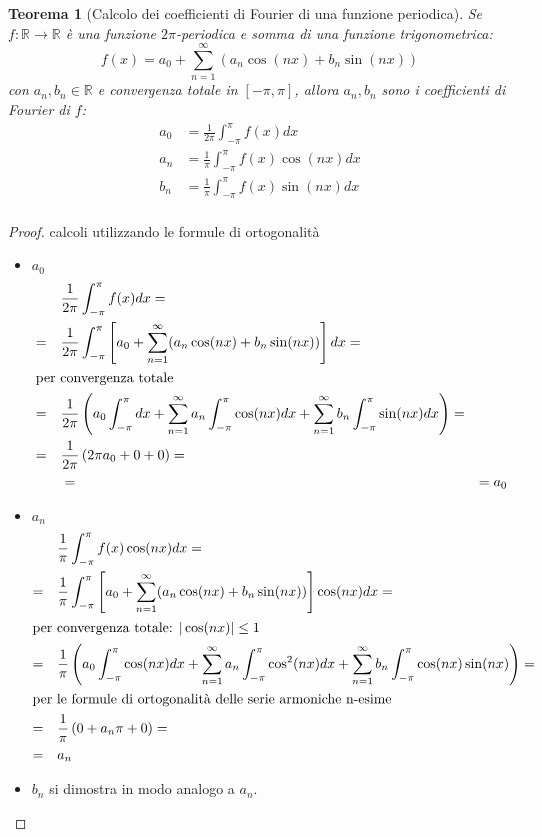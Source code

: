 \documentclass[12pt, a4paper]{article}
\theoremstyle{break}
\newtheorem{theorem}{Teorema} %
\begin{document}
\newpage
\begin{theorem} [Calcolo dei coefficienti di Fourier di una funzione periodica]
	Se $f: \mathbb{R} \to \mathbb{R}$ è una funzione $2\pi$-periodica e
	somma di una funzione trigonometrica:
	\[
		f(x) = a_0 + \sum_{n=1}^{\infty} (a_n \cos(nx) + b_n \sin(nx))
	\]
	con $a_n, b_n \in \mathbb{R}$ e convergenza totale in $[-\pi,\pi]$,
	allora $a_n, b_n$ sono i coefficienti di Fourier di $f$:
	\begin{align*}
		a_0 & = \frac{1}{2\pi} \int_{-\pi}^{\pi} f(x) dx         \\
		a_n & = \frac{1}{\pi} \int_{-\pi}^{\pi} f(x) \cos(nx) dx \\
		b_n & = \frac{1}{\pi} \int_{-\pi}^{\pi} f(x) \sin(nx) dx \\
	\end{align*}
\end{theorem}
\begin{proof} calcoli utilizzando le formule di ortogonalità
	\begin{itemize}
		\item $a_0$
			\begin{align*}
				 & \frac{1}{2\pi} \int_{-\pi}^{\pi} f(x) dx =                  \\
				= \quad & \frac{1}{2\pi} \int_{-\pi}^{\pi} \left[a_0 +
				\sum_{n=1}^{\infty} (a_n \cos(nx) + b_n \sin(nx))\right] dx  = \\
				\intertext{per convergenza totale}
				 = \quad & \frac{1}{2\pi} \left( a_0 \int_{-\pi}^{\pi} dx +
				\sum_{n=1}^{\infty} a_n \int_{-\pi}^{\pi} \cos(nx) dx +
				\sum_{n=1}^{\infty} b_n \int_{-\pi}^{\pi} \sin(nx) dx \right)
				=                                                              \\
				 = \quad & \frac{1}{2\pi} \left( 2\pi a_0 + 0 + 0 \right)   =        \\
				 &= \quad & = a_0
			\end{align*}
		\item $a_n$
			\begin{align*}
				 & \frac{1}{\pi} \int_{-\pi}^{\pi} f(x) \cos(nx) dx =         \\
				 = \quad & \frac{1}{\pi} \int_{-\pi}^{\pi} \left[a_0 +
				\sum_{n=1}^{\infty} (a_n \cos(nx) + b_n \sin(nx))\right] \cos(nx)
				dx =                                                          \\
				\intertext{per convergenza totale: $| \cos(nx) | \leq 1$ }
				 = \quad & \frac{1}{\pi} \left( a_0 \int_{-\pi}^{\pi} \cos(nx) dx +
				\sum_{n=1}^{\infty} a_n \int_{-\pi}^{\pi} \cos^2(nx) dx +
				\sum_{n=1}^{\infty} b_n \int_{-\pi}^{\pi} \cos(nx) \sin(nx)
				\right)                                                 =     \\
				\intertext{per le formule di ortogonalità delle serie armoniche
				n-esime}
				 = \quad & \frac{1}{\pi} \left( 0 + a_n \pi + 0 \right)  =          \\
				 = \quad & a_n
			\end{align*}
		\item $b_n$ si dimostra in modo analogo a $a_n$.
	\end{itemize}
\end{proof}
\end{document}
